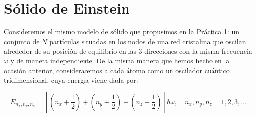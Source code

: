\documentclass[a4paper,11pt]{article}
\begin{document}
\section{Sólido de Einstein}
\label{sec:oscilador-clasico}

Consideremos el mismo modelo de sólido que propusimos en la Práctica 1:
un conjunto de $N$ partículas situadas en los nodos de una red 
cristalina que oscilan alrededor de su posición de equilibrio en las 3 
direcciones con la misma frecuencia $\omega$ y de manera independiente.
De la misma manera que hemos hecho en la ocasión anterior, 
consideraremos a cada átomo como un oscilador cuántico 
tridimensional, cuya energía viene dada por:

$$
E_{n_x, n_y, n_z} = \left[
                    \left( n_x + \frac{1}{2} \right) + 
                    \left( n_y + \frac{1}{2} \right) +
                    \left( n_z + \frac{1}{2} \right)
                    \right]
                    \hbar \omega,
\quad
n_x, n_y, n_z = 1, 2, 3, \dots
$$
\end{document}
